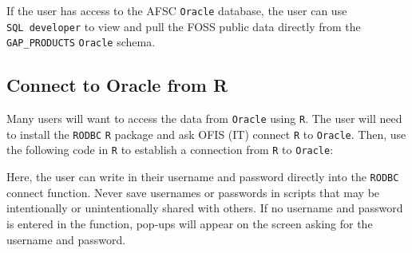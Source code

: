 \documentclass[
  letterpaper,
  oneside,
  open=any]{scrbook}
\begin{document}
If the user has access to the AFSC \texttt{Oracle} database, the user
can use \texttt{SQL\ developer} to view and pull the FOSS public data
directly from the \texttt{GAP\_PRODUCTS} \texttt{Oracle} schema.

\hypertarget{connect-to-oracle-from-r-1}{%
\subsection{Connect to Oracle from R}\label{connect-to-oracle-from-r-1}}

Many users will want to access the data from \texttt{Oracle} using
\texttt{R}. The user will need to install the \texttt{RODBC} \texttt{R}
package and ask OFIS (IT) connect \texttt{R} to \texttt{Oracle}. Then,
use the following code in \texttt{R} to establish a connection from
\texttt{R} to \texttt{Oracle}:

Here, the user can write in their username and password directly into
the \texttt{RODBC} connect function. Never save usernames or passwords
in scripts that may be intentionally or unintentionally shared with
others. If no username and password is entered in the function, pop-ups
will appear on the screen asking for the username and password.
\end{document}
